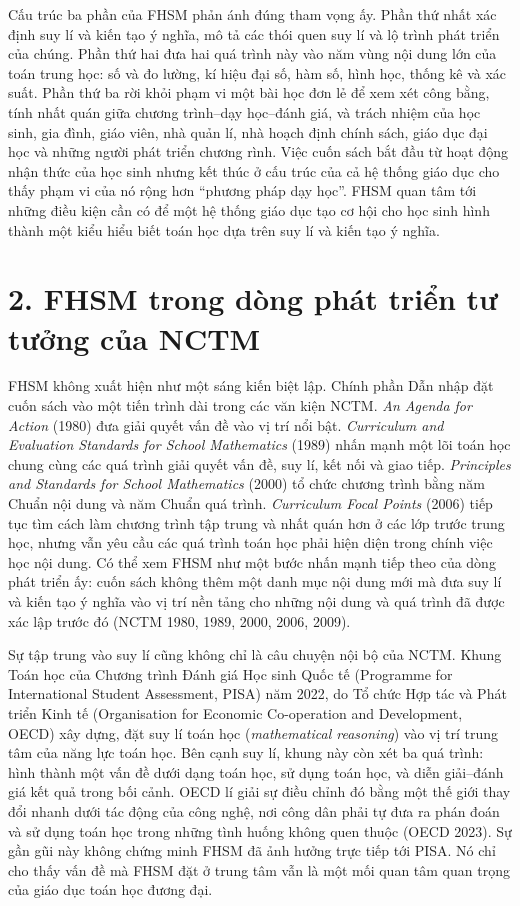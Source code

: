 Cấu trúc ba phần của FHSM phản ánh đúng tham vọng ấy. Phần thứ nhất xác định suy lí và kiến tạo ý nghĩa, mô tả các thói quen suy lí và lộ trình phát triển của chúng. Phần thứ hai đưa hai quá trình này vào năm vùng nội dung lớn của toán trung học: số và đo lường, kí hiệu đại số, hàm số, hình học, thống kê và xác suất. Phần thứ ba rời khỏi phạm vi một bài học đơn lẻ để xem xét công bằng, tính nhất quán giữa chương trình--dạy học--đánh giá, và trách nhiệm của học sinh, gia đình, giáo viên, nhà quản lí, nhà hoạch định chính sách, giáo dục đại học và những người phát triển chương  rình. Việc cuốn sách bắt đầu từ hoạt động nhận thức của học sinh nhưng kết thúc ở cấu trúc của cả hệ thống giáo dục cho thấy phạm vi của nó rộng hơn ``phương pháp dạy học''. FHSM quan tâm tới những điều kiện cần có để một hệ thống giáo dục tạo cơ hội cho học sinh hình thành một kiểu hiểu biết toán học dựa trên suy lí và kiến tạo ý nghĩa.

{}
\section*{2. FHSM trong dòng phát triển tư tưởng của NCTM}

FHSM không xuất hiện như một sáng kiến biệt lập. Chính phần Dẫn nhập đặt cuốn sách vào một tiến trình dài trong các văn kiện NCTM. \emph{An Agenda for Action} (1980) đưa giải quyết vấn đề vào vị trí nổi bật. \emph{Curriculum and Evaluation Standards for School Mathematics} (1989) nhấn mạnh một lõi toán học chung cùng các quá trình giải quyết vấn đề, suy lí, kết nối và giao tiếp. \emph{Principles and Standards for School Mathematics} (2000) tổ chức chương trình bằng năm Chuẩn nội dung và năm Chuẩn quá trình. \emph{Curriculum Focal Points} (2006) tiếp tục tìm cách làm chương trình tập trung và nhất quán hơn ở các lớp trước trung học, nhưng vẫn yêu cầu các quá trình toán học phải hiện diện trong chính việc học nội dung. Có thể xem FHSM như một bước nhấn mạnh tiếp theo của dòng phát triển ấy: cuốn sách không thêm một danh mục nội dung mới mà đưa suy lí và kiến tạo ý nghĩa vào vị trí nền tảng cho những nội dung và quá trình đã được xác lập trước đó (NCTM 1980, 1989, 2000, 2006, 2009).

Sự tập trung vào suy lí cũng không chỉ là câu chuyện nội bộ của NCTM. Khung Toán học của Chương trình Đánh giá Học sinh Quốc tế (Programme for International Student Assessment, PISA) năm 2022, do Tổ chức Hợp tác và Phát triển Kinh tế (Organisation for Economic Co-operation and Development, OECD) xây dựng, đặt suy lí toán học (\textit{mathematical reasoning}) vào vị trí trung tâm của năng lực toán học. Bên cạnh suy lí, khung này còn xét ba quá trình: hình thành một vấn đề dưới dạng toán học, sử dụng toán học, và diễn giải--đánh giá kết quả trong bối cảnh. OECD lí giải sự điều chỉnh đó bằng một thế giới thay đổi nhanh dưới tác động của công nghệ, nơi công dân phải tự đưa ra phán đoán và sử dụng toán học trong những tình huống không quen thuộc (OECD 2023). Sự gần gũi này không chứng minh FHSM đã ảnh hưởng trực tiếp tới PISA. Nó chỉ cho thấy vấn đề mà FHSM đặt ở trung tâm vẫn là một mối quan tâm quan trọng của giáo dục toán học đương đại.

